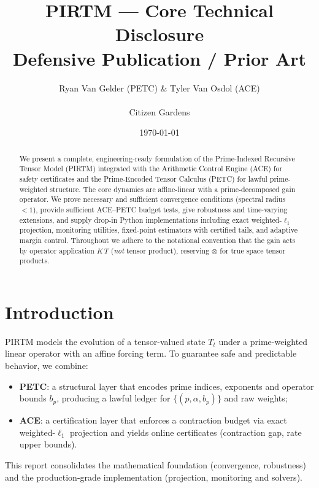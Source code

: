 \documentclass[11pt]{article}
\theoremstyle{plain}
\theoremstyle{definition}
\theoremstyle{remark}
\begin{document}
\title{PIRTM --- Core Technical Disclosure \\ Defensive Publication / Prior Art}
\author {Ryan Van Gelder (PETC) \& Tyler Van Osdol (ACE) \\ \\ Citizen Gardens}
\date{\today}
\maketitle

\begin{abstract}
We present a complete, engineering-ready formulation of the Prime-Indexed Recursive Tensor Model (PIRTM) integrated with the Arithmetic Control Engine (ACE) for safety certificates and the Prime-Encoded Tensor Calculus (PETC) for lawful prime-weighted structure. The core dynamics are affine-linear with a prime-decomposed gain operator. We prove necessary and sufficient convergence conditions (spectral radius $<1$), provide sufficient ACE--PETC budget tests, give robustness and time-varying extensions, and supply drop-in Python implementations including exact weighted-$\ell_1$ projection, monitoring utilities, fixed-point estimators with certified tails, and adaptive margin control. Throughout we adhere to the notational convention that the gain acts by operator application $K\,T$ (\emph{not} tensor product), reserving $\otimes$ for true space tensor products.
\end{abstract}
\newpage
\tableofcontents

\section{Introduction}
PIRTM models the evolution of a tensor-valued state $T_t$ under a prime-weighted linear operator with an affine forcing term. To guarantee safe and predictable behavior, we combine:
\begin{itemize}[leftmargin=*]
  \item \textbf{PETC}: a structural layer that encodes prime indices, exponents and operator bounds $b_p$, producing a lawful ledger for $\{(p,\alpha,b_p)\}$ and raw weights;
  \item \textbf{ACE}: a certification layer that enforces a contraction budget via exact weighted-$\ell_1$ projection and yields online certificates (contraction gap, rate upper bounds).
\end{itemize}
This report consolidates the mathematical foundation (convergence, robustness) and the production-grade implementation (projection, monitoring and solvers).
\end{document}
